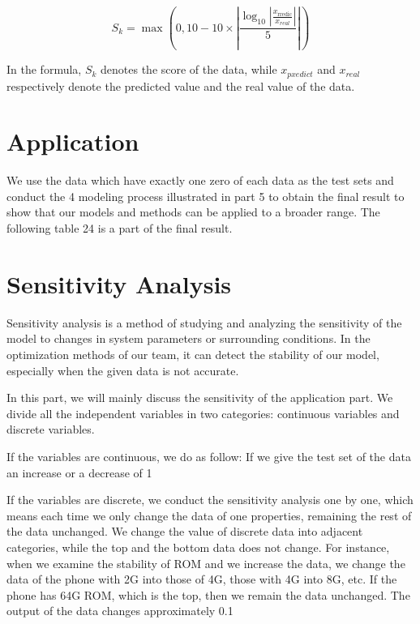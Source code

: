 \begin{equation}
S _ { k } = \max \left( 0,10 - 10 \times \left| \frac { \log _ { 10 } \left| \frac { x _ { \text {rredic} } } { x _ { r e a l } } \right| } { 5 } \right| \right)
\end{equation}

In the formula, $S _ { k }$ denotes the score of the data, while $x _ { pxedict }$ and $x _ { r e a l }$ respectively denote the predicted value and the real value of the data.

\section{Application}

We use the data which have exactly one zero of each data as the test sets and conduct the 4 modeling process illustrated in part 5 to obtain the final result to show that our models and methods can be applied to a broader range. The following table 24 is a part of the final result. 

\section{Sensitivity Analysis}

Sensitivity analysis is a method of studying and analyzing the sensitivity of the model to changes in system parameters or surrounding conditions. In the optimization methods of our team, it can detect the stability of our model, especially when the given data is not accurate. 

In this part, we will mainly discuss the sensitivity of the application part. We divide all the independent variables in two categories: continuous variables and discrete variables. 

If the variables are continuous, we do as follow: If we give the test set of the data an increase or a decrease of 1%

If the variables are discrete, we conduct the sensitivity analysis one by one, which means each time we only change the data of one properties, remaining the rest of the data unchanged. We change the value of discrete data into adjacent categories, while the top and the bottom data does not change. For instance, when we examine the stability of ROM and we increase the data, we change the data of the phone with 2G into those of 4G, those with 4G into 8G, etc. If the phone has 64G ROM, which is the top, then we remain the data unchanged. The output of the data changes approximately 0.1%

